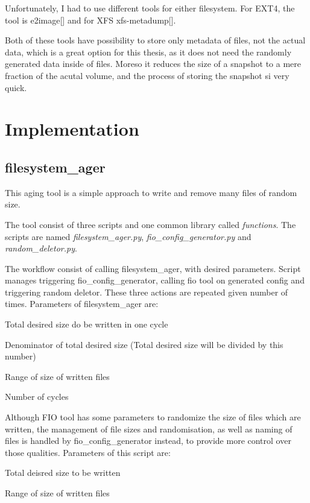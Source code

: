 \documentclass[
  color, %
  table, %
  lof,   %
  lot,   %
]{fithesis3}
\begin{document}
Unfortunately, I had to use different tools for either filesystem. For EXT4, the tool is e2image[] and for XFS xfs-metadump[].

Both of these tools have possibility to store only metadata of files, not the actual data, which is a great option for this thesis, as it does not need the randomly generated data inside of files. Moreso it reduces the size of a snapshot to a mere fraction of the acutal volume, and the process of storing the snapshot si very quick.


\chapter{Implementation}
\section{filesystem\_ager}
This aging tool is a simple approach to write and remove many files of random size.

The tool consist of three scripts and one common library called \textit{functions}. The scripts are named \textit{filesystem\_ager.py}, \textit{fio\_config\_generator.py} and \textit{random\_deletor.py}.

The workflow consist of calling filesystem\_ager, with desired parameters. Script manages triggering fio\_config\_generator, calling fio tool on generated config and triggering random deletor. These three actions are repeated given number of times.
Parameters of filesystem\_ager are: 
\begin{compactenum}
  \item Total desired size do be written in one cycle
  \item Denominator of total desired size (Total desired size will be divided by this number)
  \item Range of size of written files
  \item Number of cycles
\end{compactenum}

Although FIO tool has some parameters to randomize the size of files which are written, the management of file sizes and randomisation, as well as naming of files is handled by fio\_config\_generator instead, to provide more control over those qualities.
Parameters of this script are:
\begin{compactenum}
  \item Total deisred size to be written
  \item Range of size of written files
\end{compactenum}
\end{document}
